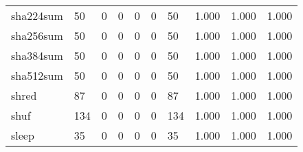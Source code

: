 \begin{longtable}{lp{1.3cm}p{1.3cm}p{1.3cm}p{1.3cm}p{1.3cm}p{1.3cm}p{1.3cm}p{1.3cm}p{1.3cm}}
sha224sum &                     50 &                                             0 &                                            0 &                                           0 &                                            0 &                                         50 &                                1.000 &                                  1.000 &                                1.000 \\
sha256sum &                     50 &                                             0 &                                            0 &                                           0 &                                            0 &                                         50 &                                1.000 &                                  1.000 &                                1.000 \\
sha384sum &                     50 &                                             0 &                                            0 &                                           0 &                                            0 &                                         50 &                                1.000 &                                  1.000 &                                1.000 \\
sha512sum &                     50 &                                             0 &                                            0 &                                           0 &                                            0 &                                         50 &                                1.000 &                                  1.000 &                                1.000 \\
shred     &                     87 &                                             0 &                                            0 &                                           0 &                                            0 &                                         87 &                                1.000 &                                  1.000 &                                1.000 \\
shuf      &                    134 &                                             0 &                                            0 &                                           0 &                                            0 &                                        134 &                                1.000 &                                  1.000 &                                1.000 \\
sleep     &                     35 &                                             0 &                                            0 &                                           0 &                                            0 &                                         35 &                                1.000 &                                  1.000 &                                1.000 \\

\end{longtable}
